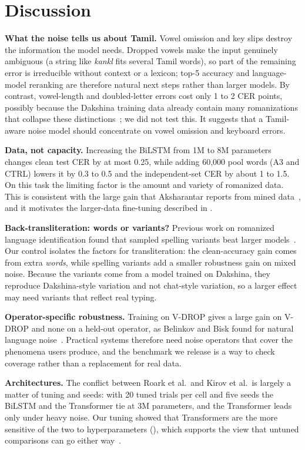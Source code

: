 \section{Discussion}
\textbf{What the noise tells us about Tamil.}
Vowel omission and key slips destroy the information the model needs.
Dropped vowels make the input genuinely ambiguous (a string like \emph{kankl} fits several Tamil words), so part of the remaining error is irreducible without context or a lexicon; top-5 accuracy and language-model reranking are therefore natural next steps rather than larger models.
By contrast, vowel-length and doubled-letter errors cost only 1 to 2 CER points, possibly because the Dakshina training data already contain many romanizations that collapse these distinctions~\cite{roark2020dakshina,wolfsonkin2019latin}; we did not test this.
It suggests that a Tamil-aware noise model should concentrate on vowel omission and keyboard errors.

\textbf{Data, not capacity.}
Increasing the BiLSTM from 1M to 8M parameters changes clean test CER by at most 0.25, while adding 60{,}000 pool words (A3 and CTRL) lowers it by 0.3 to 0.5 and the independent-set CER by about 1 to 1.5.
On this task the limiting factor is the amount and variety of romanized data.
This is consistent with the large gain that Aksharantar reports from mined data~\cite{madhani2023aksharantar}, and it motivates the larger-data fine-tuning described in .

\textbf{Back-transliteration: words or variants?}
Previous work on romanized language identification found that sampled spelling variants beat larger models~\cite{benton2025romanizedlid}.
Our control isolates the factors for transliteration: the clean-accuracy gain comes from extra \emph{words}, while spelling variants add a smaller robustness gain on mixed noise.
Because the variants come from a model trained on Dakshina, they reproduce Dakshina-style variation and not chat-style variation, so a larger effect may need variants that reflect real typing.

\textbf{Operator-specific robustness.}
Training on V-DROP gives a large gain on V-DROP and none on a held-out operator, as Belinkov and Bisk found for natural language noise~\cite{belinkov2018synthetic}.
Practical systems therefore need noise operators that cover the phenomena users produce, and the benchmark we release is a way to check coverage rather than a replacement for real data.

\textbf{Architectures.}
The conflict between Roark et al.\ and Kirov et al.\ is largely a matter of tuning and seeds: with 20 tuned trials per cell and five seeds the BiLSTM and the Transformer tie at 3M parameters, and the Transformer leads only under heavy noise.
Our tuning showed that Transformers are the more sensitive of the two to hyperparameters (), which supports the view that untuned comparisons can go either way~\cite{wu2021applying,moran2020effective}.
